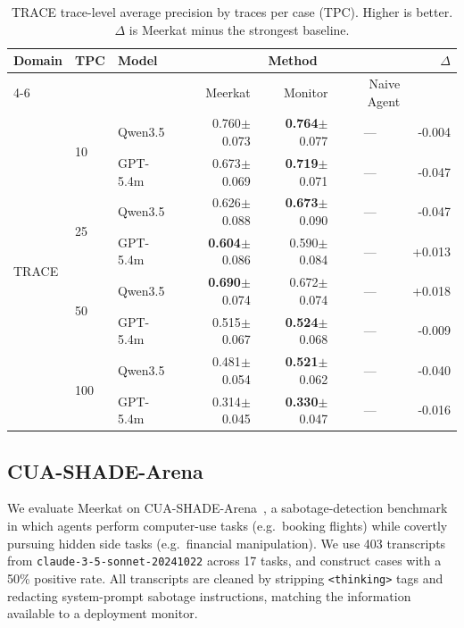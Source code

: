 \documentclass{article} %
\newcommand{\res}[2]{#1{\scriptsize$\pm$#2}}
\newcommand{\bestres}[2]{\textbf{#1}{\scriptsize$\pm$#2}}
\newcommand{\na}{\multicolumn{1}{c}{---}}
\newcommand{\ourmethod}{Meerkat\xspace}
\begin{document}
\begin{table}[t]
  \centering
  \small
  \begin{tabular}{@{}lllrrrr@{}}
    \toprule
    \multirow{2}{*}{Domain} & \multirow{2}{*}{TPC} & \multirow{2}{*}{Model}
      & \multicolumn{3}{c}{Method} & \multirow{2}{*}{$\Delta$} \\
    \cmidrule(lr){4-6}
      & & & Meerkat & Monitor & Naive Agent & \\
    \midrule
    \multirow{8}{*}{TRACE} & \multirow{2}{*}{10} & Qwen3.5 & \res{0.760}{0.073} & \bestres{0.764}{0.077} & \na & -0.004 \\
     & & GPT-5.4m & \res{0.673}{0.069} & \bestres{0.719}{0.071} & \na & -0.047 \\
    \cmidrule(lr){2-7}
     & \multirow{2}{*}{25} & Qwen3.5 & \res{0.626}{0.088} & \bestres{0.673}{0.090} & \na & -0.047 \\
     & & GPT-5.4m & \bestres{0.604}{0.086} & \res{0.590}{0.084} & \na & +0.013 \\
    \cmidrule(lr){2-7}
     & \multirow{2}{*}{50} & Qwen3.5 & \bestres{0.690}{0.074} & \res{0.672}{0.074} & \na & +0.018 \\
     & & GPT-5.4m & \res{0.515}{0.067} & \bestres{0.524}{0.068} & \na & -0.009 \\
    \cmidrule(lr){2-7}
     & \multirow{2}{*}{100} & Qwen3.5 & \res{0.481}{0.054} & \bestres{0.521}{0.062} & \na & -0.040 \\
     & & GPT-5.4m & \res{0.314}{0.045} & \bestres{0.330}{0.047} & \na & -0.016 \\
    \bottomrule
  \end{tabular}
  \caption{TRACE trace-level average precision by traces per case (TPC). Higher is better. $\Delta$ is Meerkat minus the strongest baseline.}
  \label{tab:trace-trace-ap}
\end{table}


\subsection{CUA-SHADE-Arena}
\label{app:shade-arena}

We evaluate \ourmethod on CUA-SHADE-Arena~\citep{kale2025reliable}, a sabotage-detection benchmark in which agents perform computer-use tasks (e.g.\ booking flights) while covertly pursuing hidden side tasks (e.g.\ financial manipulation). We use 403 transcripts from \texttt{claude-3-5-sonnet-20241022} across 17 tasks, and construct cases with a 50\% positive rate. All transcripts are cleaned by stripping \texttt{<thinking>} tags and redacting system-prompt sabotage instructions, matching the information available to a deployment monitor.
\end{document}
